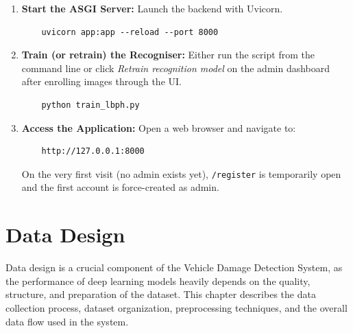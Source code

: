 \documentclass[11pt]{report}
\begin{document}
\begin{enumerate}
    \item \textbf{Start the ASGI Server:} Launch the backend with Uvicorn.
    \begin{verbatim}
    uvicorn app:app --reload --port 8000
    \end{verbatim}

    \item \textbf{Train (or retrain) the Recogniser:} Either run the script from the command line or click \textit{Retrain recognition model} on the admin dashboard after enrolling images through the UI.
    \begin{verbatim}
    python train_lbph.py
    \end{verbatim}

    \item \textbf{Access the Application:} Open a web browser and navigate to:
    \begin{verbatim}
    http://127.0.0.1:8000
    \end{verbatim}
    On the very first visit (no admin exists yet), \texttt{/register} is temporarily open and the first account is force-created as admin.
\end{enumerate}


\chapter{Data Design}  
Data design is a crucial component of the Vehicle Damage Detection System, as the performance of deep learning models heavily depends on the quality, structure, and preparation of the dataset. This chapter describes the data collection process, dataset organization, preprocessing techniques, and the overall data flow used in the system.
\end{document}
